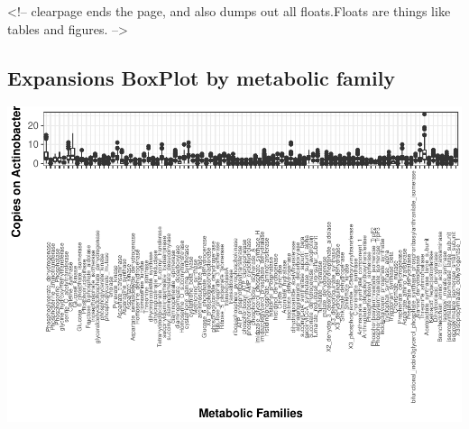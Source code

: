 \documentclass[12pt,twoside]{reedthesis}
\begin{document}
  \clearpage
  <!-- clearpage ends the page, and also dumps out all floats.Floats are things like tables and figures. 
  -->
  
  \subsection{Expansions BoxPlot by metabolic
  family}\label{expansions-boxplot-by-metabolic-family-1}
  
  \begin{center}\includegraphics{tesis_files/figure-latex/boxplot_ActinoHP-1} \end{center}
  
  \begin{Shaded}
  \begin{Highlighting}[]
  \NormalTok{(} \NormalTok{, } \NormalTok{,} \NormalTok{, } \NormalTok{)}
  \end{Highlighting}
  \end{Shaded}
  
\end{document}
